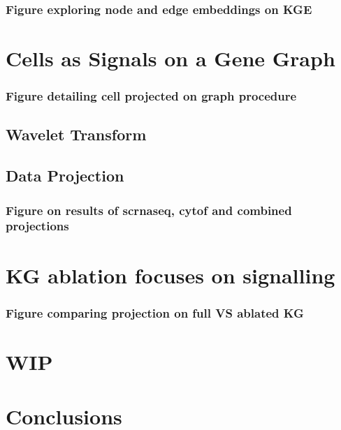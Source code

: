 \subsubsection{Figure exploring node and edge embeddings on KGE}

\section{Cells as Signals on a Gene Graph}

\subsubsection{Figure detailing cell projected on graph procedure}

\subsection{Wavelet Transform}

\subsection{Data Projection}

\subsubsection{Figure on results of scrnaseq, cytof and combined projections}

\section{KG ablation focuses on signalling}

\subsubsection{Figure comparing projection on full VS ablated KG}

\section{WIP}

\section{Conclusions}
